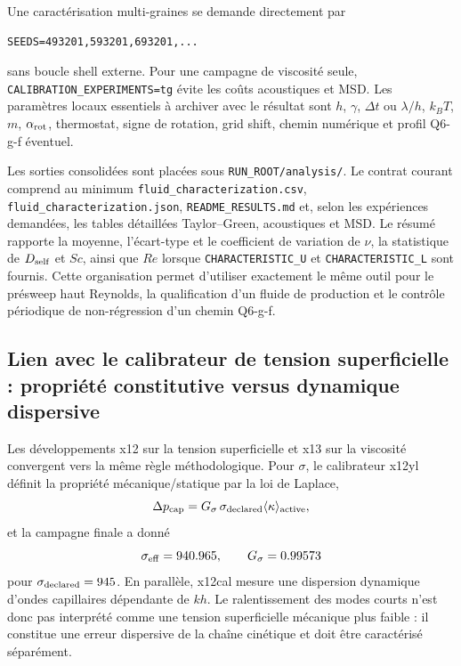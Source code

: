 \documentclass[11pt,a4paper]{article}
\begin{document}
Une caractérisation multi-graines se demande directement par
\begin{verbatim}
SEEDS=493201,593201,693201,...
\end{verbatim}
sans boucle shell externe. Pour une campagne de viscosité seule, \texttt{CALIBRATION\_EXPERIMENTS=tg} évite les coûts acoustiques et MSD. Les paramètres locaux essentiels à archiver avec le résultat sont $h$, $\gamma$, $\Delta t$ ou $\lambda/h$, $k_BT$, $m$, $\alpha_{\rm rot}$, thermostat, signe de rotation, grid shift, chemin numérique et profil Q6-g-f éventuel.

Les sorties consolidées sont placées sous \texttt{RUN\_ROOT/analysis/}. Le contrat courant comprend au minimum \texttt{fluid\_characterization.csv}, \texttt{fluid\_characterization.json}, \texttt{README\_RESULTS.md} et, selon les expériences demandées, les tables détaillées Taylor--Green, acoustiques et MSD. Le résumé rapporte la moyenne, l'écart-type et le coefficient de variation de $\nu$, la statistique de $D_{\rm self}$ et $Sc$, ainsi que $Re$ lorsque \texttt{CHARACTERISTIC\_U} et \texttt{CHARACTERISTIC\_L} sont fournis. Cette organisation permet d'utiliser exactement le même outil pour le présweep haut Reynolds, la qualification d'un fluide de production et le contrôle périodique de non-régression d'un chemin Q6-g-f.

\subsection{Lien avec le calibrateur de tension superficielle : propriété constitutive versus dynamique dispersive}

Les développements x12 sur la tension superficielle et x13 sur la viscosité convergent vers la même règle méthodologique. Pour $\sigma$, le calibrateur x12yl définit la propriété mécanique/statique par la loi de Laplace,
\begin{equation}
  \Delta p_{\rm cap}
  =
  G_\sigma\,\sigma_{\rm declared}
  \langle\kappa\rangle_{\rm active},
\end{equation}
et la campagne finale a donné
\begin{equation}
  \sigma_{\rm eff}=940.965,\qquad
  G_\sigma=0.99573
\end{equation}
pour $\sigma_{\rm declared}=945$. En parallèle, x12cal mesure une dispersion dynamique d'ondes capillaires dépendante de $kh$. Le ralentissement des modes courts n'est donc pas interprété comme une tension superficielle mécanique plus faible : il constitue une erreur dispersive de la chaîne cinétique et doit être caractérisé séparément.
\end{document}
